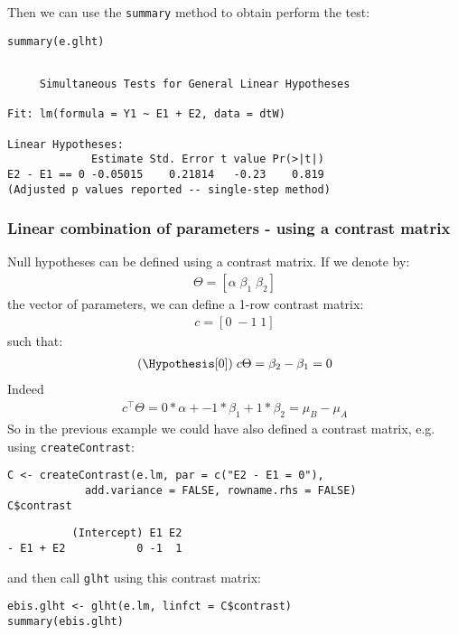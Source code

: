 \documentclass{article}
\newcommand\trans[1]{{#1}^\intercal}%
\begin{document}
Then we can use the \texttt{summary} method to obtain perform the test:
\lstset{language=r,label= ,caption= ,captionpos=b,numbers=none}
\begin{lstlisting}
summary(e.glht)
\end{lstlisting}
\begin{verbatim}

	 Simultaneous Tests for General Linear Hypotheses

Fit: lm(formula = Y1 ~ E1 + E2, data = dtW)

Linear Hypotheses:
             Estimate Std. Error t value Pr(>|t|)
E2 - E1 == 0 -0.05015    0.21814   -0.23    0.819
(Adjusted p values reported -- single-step method)
\end{verbatim}

\subsubsection{Linear combination of parameters - using a contrast matrix}
\label{sec:org9d0a31b}

Null hypotheses can be defined using a contrast matrix. If we denote
by:
\begin{align*}
\Theta=[\alpha \; \beta_1 \; \beta_2]
\end{align*}
the vector of parameters, we can define a 1-row contrast matrix:
\begin{align*}
c=[0 \; -1 \; 1]
\end{align*}
such that: 
\begin{align*}
(\Hypothesis[0]) \; c \Theta = \beta_2 - \beta_1 = 0
\end{align*}
Indeed
\begin{align*}
\trans{c} \Theta = 0 * \alpha + -1 * \beta_1 + 1 * \beta_2 = \mu_B - \mu_A
\end{align*}
So in the previous example we could have also defined a contrast
matrix, e.g. using \texttt{createContrast}:
\lstset{language=r,label= ,caption= ,captionpos=b,numbers=none}
\begin{lstlisting}
C <- createContrast(e.lm, par = c("E2 - E1 = 0"),
		    add.variance = FALSE, rowname.rhs = FALSE)
C$contrast
\end{lstlisting}

\begin{verbatim}
          (Intercept) E1 E2
- E1 + E2           0 -1  1
\end{verbatim}

and then call \texttt{glht} using this contrast matrix:
\lstset{language=r,label= ,caption= ,captionpos=b,numbers=none}
\begin{lstlisting}
ebis.glht <- glht(e.lm, linfct = C$contrast)
summary(ebis.glht)
\end{lstlisting}
\end{document}
